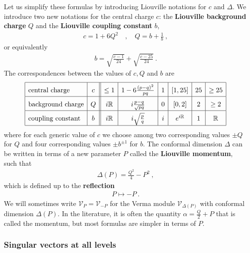 \documentclass[12pt, a4paper, notitlepage, twoside]{report}
\numberwithin{equation}{section}
\theoremstyle{break}
\begin{document}
Let us simplify these formulas by introducing Liouville notations for $c$ and $\Delta$.
We introduce two new notations for the central charge $c$: the \textbf{\boldmath Liouville background charge} $Q$ and the \textbf{\boldmath Liouville coupling constant} $b$,
\begin{align}
\boxed{ c= 1+6Q^2 }\quad , \quad \boxed{Q = b+\frac{1}{b}}\ ,
\label{cqb}
\end{align}
or equivalently
\begin{align}
 b = \sqrt{\frac{c-1}{24}} + \sqrt{\frac{c-25}{24}}\ .
\end{align}
The correspondences between the values of $c,Q$ and $b$ are 
\begin{align}
\renewcommand{\arraystretch}{1.7}
 \begin{array}{|l|c||c|c|c|c|c|c|}
  \hline
  \text{central\ charge} & c & \leq 1 & 1-6\frac{(p-q)^2}{pq} & 1 & [1,25] & 25 & \geq 25 
\\
\hline
\text{background\ charge} & Q & i{\mathbb{R}} & i\frac{p-q}{\sqrt{pq}} & 0 & [0,2] & 2 & \geq 2 
\\
\hline
\text{coupling\ constant} &
b& i{\mathbb{R}} & i\sqrt{\frac{p}{q}} & i & e^{i\mathbb{R}} & 1 & {\mathbb{R}}
\\
\hline
 \end{array}
\label{cqbval}
\end{align}
where for each generic value of $c$ we choose among two corresponding values $\pm Q$ for $Q$ and four corresponding values $\pm b^{\pm 1}$ for $b$.
The conformal dimension $\Delta$ can be written in terms of a 
new parameter $P$ called the \textbf{\boldmath Liouville momentum}, such that 
\begin{align}
 \boxed{\Delta(P) = \frac{Q^2}{4} - P^2}\ ,
\label{daq}
\end{align}
which is defined up to the \textbf{\boldmath reflection}
\begin{align}
 P \mapsto -P\ .
\label{arqa}
\end{align}
We will sometimes write $\mathcal{V}_P=\mathcal{V}_{-P}$ for the Verma module $\mathcal{V}_{\Delta(P)}$ with conformal dimension $\Delta(P)$. In the literature, it is often the quantity $\alpha = \frac{Q}{2}+P$ that is called the momentum, but most formulas are simpler in terms of $P$.


\subsubsection{Singular vectors at all levels}
\end{document}
